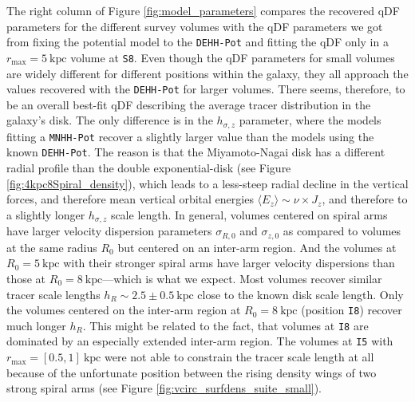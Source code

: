 \documentclass[iop,revtex4,numberedappendix,appendixfloats]{emulateapj}
\begin{document}
The right column of Figure \ref{fig:model_parameters} compares the recovered qDF parameters for the different survey volumes with the qDF parameters we got from fixing the potential model to the \texttt{DEHH-Pot} and fitting the qDF only in a $r_\text{max}=5~\text{kpc}$ volume at \texttt{S8}. Even though the qDF parameters for small volumes are widely different for different positions within the galaxy, they all approach the values recovered with the \texttt{DEHH-Pot} for larger volumes. There seems, therefore, to be an overall best-fit qDF describing the average tracer distribution in the galaxy's disk. The only difference is in the $h_{\sigma,z}$ parameter, where the models fitting a \texttt{MNHH-Pot} recover a slightly larger value than the models using the known \texttt{DEHH-Pot}. The reason is that the Miyamoto-Nagai disk has a different radial profile than the double exponential-disk (see Figure \ref{fig:4kpc8Spiral_density}), which leads to a less-steep radial decline in the vertical forces, and therefore mean vertical orbital energies $\langle E_z \rangle \sim \nu \times J_z$, and therefore to a slightly longer $h_{\sigma,z}$ scale length. In general, volumes centered on spiral arms have larger velocity dispersion parameters $\sigma_{R,0}$ and $\sigma_{z,0}$ as compared to volumes at the same radius $R_0$ but centered on an inter-arm region. And the volumes at $R_0=5~\text{kpc}$ with their stronger spiral arms have larger velocity dispersions than those at $R_0=8~\text{kpc}$---which is what we expect. Most volumes recover similar tracer scale lengths $h_R\sim2.5\pm0.5~\text{kpc}$ close to the known disk scale length. Only the volumes centered on the inter-arm region at $R_0=8~\text{kpc}$ (position \texttt{I8}) recover much longer $h_R$. This might be related to the fact, that volumes at \texttt{I8} are dominated by an especially extended inter-arm region. The volumes at \texttt{I5} with $r_\text{max}=[0.5,1]~\text{kpc}$ were not able to constrain the tracer scale length at all because of the unfortunate position between the rising density wings of two strong spiral arms (see Figure \ref{fig:vcirc_surfdens_suite_small}).
\end{document}
